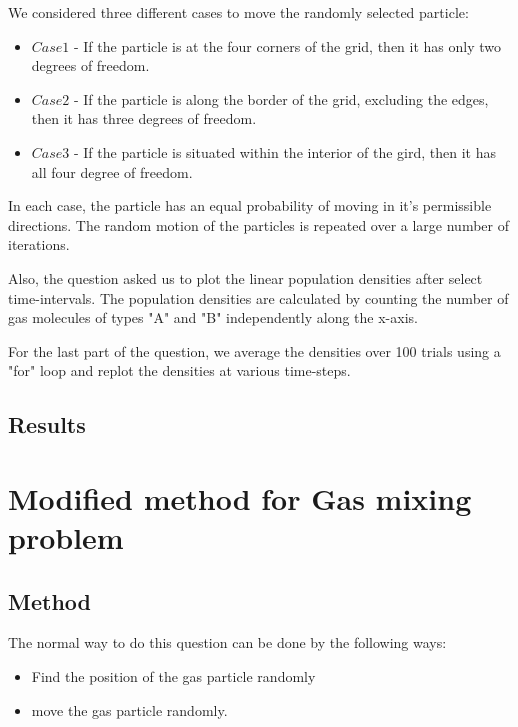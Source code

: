 \documentclass[11pt, oneside]{article}  	%
\begin{document}
We considered three different cases to move the randomly selected particle:

\begin{itemize}

\item $Case 1$ - If the particle is at the four corners of the grid, then it has only two degrees of freedom.

\item $Case 2$ - If the particle is along the border of the grid, excluding the edges, then it has three degrees of freedom.

\item $Case 3$ - If the particle is situated within the interior of the gird, then it has all four degree of freedom. 

\end{itemize}

In each case, the particle has an equal probability of moving in it's permissible directions. The random motion of the particles is repeated over a large number of iterations.

Also, the question asked us to plot the linear population densities after select time-intervals. The population densities are calculated by counting the number of gas molecules of types "A" and "B" independently along the x-axis.

For the last part of the question, we average the densities over 100 trials using a "for" loop and replot the densities at various time-steps.

\subsection{Results}

\section{Modified method for Gas mixing problem}
\subsection{Method}
The normal way to do this question can be done by the following ways: 

\begin{itemize}
\item Find the position of the gas particle randomly
\item move the gas particle randomly. 
\end{itemize}
\end{document}
